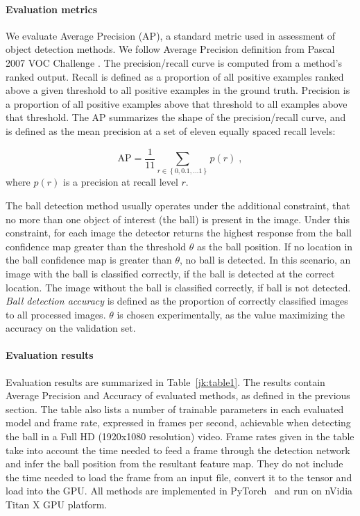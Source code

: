 \documentclass[a4paper,twoside]{article}
\begin{document}
\paragraph{Evaluation metrics}
\label{sec:metrics}
We evaluate Average Precision (AP), a standard metric used in assessment of object detection methods. We follow Average Precision definition from Pascal 2007 VOC Challenge \cite{Ever10}.
The precision/recall curve is computed from a method’s ranked output. Recall is defined as a proportion of all positive examples ranked above a given threshold to all positive examples in the ground truth. Precision is a proportion of all positive examples above that threshold to all examples above that threshold. The AP summarizes the shape of the precision/recall curve, and is defined as the mean precision at a set of eleven equally spaced recall levels:

\begin{equation}
\mathrm{AP} = \frac{1}{11} \sum_{r \in \left\{ 0, 0.1, \ldots 1 \right\}} p(r) \; ,\end{equation} 
where $p(r)$ is a precision at recall level $r$.

The ball detection method usually operates under the additional constraint, that no more than one object of interest (the ball) is present in the image. Under this constraint, for each image the detector returns the highest response from the ball confidence map greater than the threshold $\theta$ as the ball position. If no location in the ball confidence map is greater than $\theta$, no ball is detected. In this scenario, an image with the ball is classified correctly, if the ball is detected at the correct location. The image without the ball is classified correctly, if ball is not detected. \emph{Ball detection accuracy} is defined as the proportion of correctly classified images to all processed images. $\theta$ is chosen experimentally, as the value maximizing the accuracy on the validation set.

\paragraph{Evaluation results}
\label{jk:ev_results}
Evaluation results are summarized in Table~\ref{jk:table1}. The results contain Average Precision and Accuracy of evaluated methods, as defined in the previous section. 
The table also lists a number of trainable parameters in each evaluated model and frame rate, expressed in frames per second, achievable when detecting the ball in a Full HD (1920x1080 resolution) video.
Frame rates given in the table take into account the time needed to feed a frame through the detection network and infer the ball position from the resultant feature map. 
They do not include the time needed to load the frame from an input file, convert it to the tensor and load into the GPU. All methods are implemented in PyTorch~\cite{Pasz17} and run on nVidia Titan X GPU platform.
\end{document}

